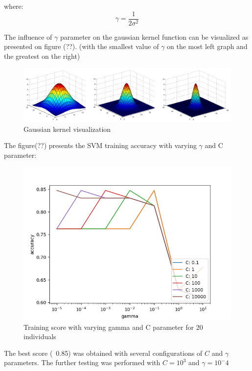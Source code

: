 where:
\begin{equation}
\gamma = \frac{1}{2\sigma^2}
\end{equation}

The influence of $\gamma$ parameter on the gaussian kernel function can be visualized as presented on figure (??). (with the smallest value of $\gamma$ on the most left graph and the greatest on the right) 


\begin{figure}[H]
\centering
\includegraphics[scale=0.27]{img/svm/gaussian.png}
\caption{Gaussian kernel visualization}
\end{figure} 

The figure(??) presents the SVM training accuracy with varying $\gamma$ and C parameter:

\begin{figure}[H]
\centering
\includegraphics[scale=0.75]{img/svm/better_graphs/CFD_20i_rbf.png}
\caption{Training score with varying gamma and C parameter for 20 individuals}
\end{figure} 


The best score (~0.85) was obtained with several configurations of $C$ and $\gamma$ parameters. The further testing was performed with $C = 10^3$ and $\gamma = 10^-4$

